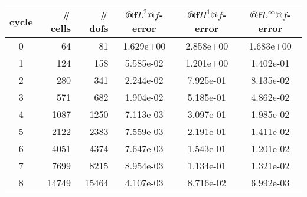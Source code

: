 \documentclass[10pt]{report}
\begin{document}
\begin{table}[H]
\begin{center}
\begin{tabular}{|c|r|r|c|c|c|} \hline
cycle & \# cells & \# dofs & @f$L^2@f$-error & @f$H^1@f$-error & @f$L^\infty@f$-error\\ \hline
0 & 64 & 81 & 1.629e+00 & 2.858e+00 & 1.683e+00\\ \hline
1 & 124 & 158 & 5.585e-02 & 1.201e+00 & 1.402e-01\\ \hline
2 & 280 & 341 & 2.244e-02 & 7.925e-01 & 8.135e-02\\ \hline
3 & 571 & 682 & 1.904e-02 & 5.185e-01 & 4.862e-02\\ \hline
4 & 1087 & 1250 & 7.113e-03 & 3.097e-01 & 1.985e-02\\ \hline
5 & 2122 & 2383 & 7.559e-03 & 2.191e-01 & 1.411e-02\\ \hline
6 & 4051 & 4374 & 7.647e-03 & 1.543e-01 & 1.201e-02\\ \hline
7 & 7699 & 8215 & 8.954e-03 & 1.134e-01 & 1.321e-02\\ \hline
8 & 14749 & 15464 & 4.107e-03 & 8.716e-02 & 6.992e-03\\ \hline
\end{tabular}
\end{center}
\end{table}
\end{document}
